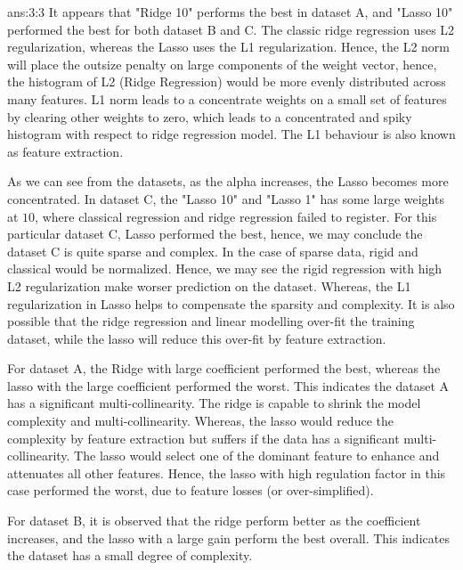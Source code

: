 \documentclass{tron}
\begin{document}
\begin{answer}[]{ans:3:3}
	It appears that "Ridge 10" performs the best in dataset A, and "Lasso 10" performed the best for both dataset B and C.
The classic ridge regression uses L2 regularization, whereas the Lasso uses the L1 regularization. Hence, the L2 norm will place the outsize penalty on large components of the weight vector, hence, the histogram of L2 (Ridge Regression) would be more evenly distributed across many features. L1 norm leads to a concentrate weights on a small set of features by clearing other weights to zero, which leads to a concentrated and spiky histogram with respect to ridge regression model. The L1 behaviour is also known as feature extraction.

As we can see from the datasets, as the alpha increases, the Lasso becomes more concentrated. In dataset C, the "Lasso 10" and "Lasso 1" has some large weights at $10$, where classical regression and ridge regression failed to register. For this particular dataset C, Lasso performed the best, hence, we may conclude the dataset C is quite sparse and complex. In the case of sparse data, rigid and classical would be normalized. Hence, we may see the rigid regression with high L2 regularization make worser prediction on the dataset. Whereas, the L1 regularization in Lasso helps to compensate the sparsity and complexity. It is also possible that the ridge regression and linear modelling over-fit the training dataset, while the lasso will reduce this over-fit by feature extraction. 

For dataset A, the Ridge with large coefficient performed the best, whereas the lasso with the large coefficient performed the worst. This indicates the dataset A has a significant multi-collinearity. The ridge is capable to shrink the model complexity and multi-collinearity. Whereas, the lasso would reduce the complexity by feature extraction but suffers if the data has a significant multi-collinearity. The lasso would select one of the dominant feature to enhance and attenuates all other features. Hence, the lasso with high regulation factor in this case performed the worst, due to feature losses (or over-simplified).

For dataset B, it is observed that the ridge perform better as the coefficient increases, and the lasso with a large gain perform the best overall. This indicates the dataset has a small degree of complexity.



\end{answer}
\end{document}
